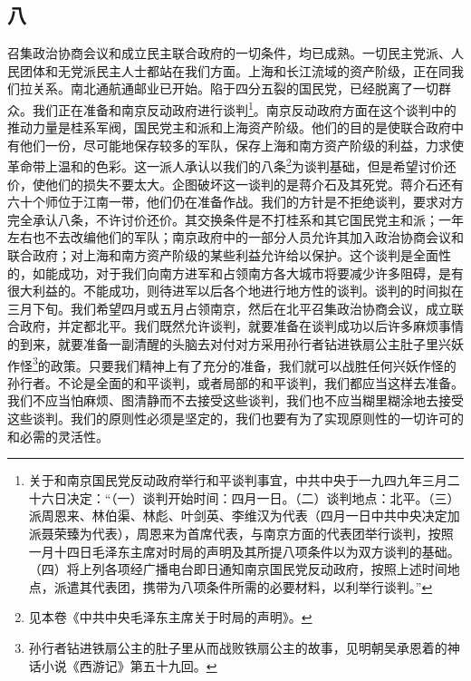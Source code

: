 \documentclass[cn,11pt,chinese]{elegantbook}
\def\myformat#1{\hfil\hfil #1}
\begin{document}
\subsection*{\myformat{八 }}
召集政治协商会议和成立民主联合政府的一切条件，均已成熟。一切民主党派、人民团体和无党派民主人士都站在我们方面。上海和长江流域的资产阶级，正在同我们拉关系。南北通航通邮业已开始。陷于四分五裂的国民党，已经脱离了一切群众。我们正在准备和南京反动政府进行谈判\footnote[3]{ 关于和南京国民党反动政府举行和平谈判事宜，中共中央于一九四九年三月二十六日决定：“（一）谈判开始时间：四月一日。（二）谈判地点：北平。（三）派周恩来、林伯渠、林彪、叶剑英、李维汉为代表（四月一日中共中央决定加派聂荣臻为代表），周恩来为首席代表，与南京方面的代表团举行谈判，按照一月十四日毛泽东主席对时局的声明及其所提八项条件以为双方谈判的基础。（四）将上列各项经广播电台即日通知南京国民党反动政府，按照上述时间地点，派遣其代表团，携带为八项条件所需的必要材料，以利举行谈判。”}。南京反动政府方面在这个谈判中的推动力量是桂系军阀，国民党主和派和上海资产阶级。他们的目的是使联合政府中有他们一份，尽可能地保存较多的军队，保存上海和南方资产阶级的利益，力求使革命带上温和的色彩。这一派人承认以我们的八条\footnote[4]{ 见本卷《中共中央毛泽东主席关于时局的声明》。}为谈判基础，但是希望讨价还价，使他们的损失不要太大。企图破坏这一谈判的是蒋介石及其死党。蒋介石还有六十个师位于江南一带，他们仍在准备作战。我们的方针是不拒绝谈判，要求对方完全承认八条，不许讨价还价。其交换条件是不打桂系和其它国民党主和派；一年左右也不去改编他们的军队；南京政府中的一部分人员允许其加入政治协商会议和联合政府；对上海和南方资产阶级的某些利益允许给以保护。这个谈判是全面性的，如能成功，对于我们向南方进军和占领南方各大城市将要减少许多阻碍，是有很大利益的。不能成功，则待进军以后各个地进行地方性的谈判。谈判的时间拟在三月下旬。我们希望四月或五月占领南京，然后在北平召集政治协商会议，成立联合政府，并定都北平。我们既然允许谈判，就要准备在谈判成功以后许多麻烦事情的到来，就要准备一副清醒的头脑去对付对方采用孙行者钻进铁扇公主肚子里兴妖作怪\footnote[5]{ 孙行者钻进铁扇公主的肚子里从而战败铁扇公主的故事，见明朝吴承恩着的神话小说《西游记》第五十九回。 }的政策。只要我们精神上有了充分的准备，我们就可以战胜任何兴妖作怪的孙行者。不论是全面的和平谈判，或者局部的和平谈判，我们都应当这样去准备。我们不应当怕麻烦、图清静而不去接受这些谈判，我们也不应当糊里糊涂地去接受这些谈判。我们的原则性必须是坚定的，我们也要有为了实现原则性的一切许可的和必需的灵活性。\\
\end{document}
